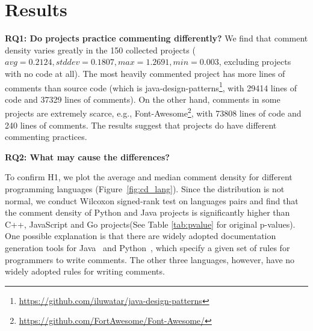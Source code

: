 \documentclass[sigconf,screen]{acmart}
\begin{document}
\section{Results}

\textbf{RQ1: Do projects practice commenting differently?}
We find that comment density varies greatly in the 150 collected projects ($avg=0.2124, stddev=0.1807, max=1.2691, min=0.003$, excluding projects with no code at all). The most heavily commented project has more lines of comments than source code (which is java-design-patterns\footnote{\url{https://github.com/iluwatar/java-design-patterns}}, with 29414 lines of code and 37329 lines of comments). On the other hand, comments in some projects are extremely scarce, e.g., Font-Awesome\footnote{\url{https://github.com/FortAwesome/Font-Awesome/}}, with 73808 lines of code and 240 lines of comments. The results suggest that projects do have different commenting practices. %

\textbf{RQ2: What may cause the differences?}

To confirm H1, we plot the average and median comment density for different programming languages (Figure~\ref{fig:cd_lang}). Since the distribution is not normal, we conduct Wilcoxon signed-rank test on languages pairs and find that the comment density of Python and Java projects is significantly higher than C++, JavaScript and Go projects(See Table \ref{tab:pvalue} for original p-values). One possible explanation is that there are widely adopted documentation generation tools for Java~\cite{Javadoc} and Python~\cite{Sphinx}, which specify a given set of rules for programmers to write comments. The other three languages, however, have no widely adopted rules for writing comments.
\end{document}
